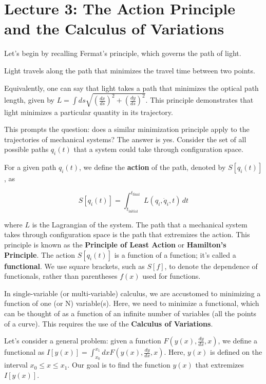 \section{Lecture 3: The Action Principle and the Calculus of Variations}

Let's begin by recalling Fermat's principle, which governs the path of light.

\begin{definition}
    Light travels along the path that minimizes the travel time between two points.
\end{definition}

Equivalently, one can say that light takes a path that minimizes the optical path length, 
given by $L = \int ds \sqrt{\left(\frac{dx}{ds}\right)^2 + \left(\frac{dy}{ds}\right)^2}$. This principle demonstrates that light minimizes a particular quantity in its trajectory.

This prompts the question: does a similar minimization principle apply to the 
trajectories of mechanical systems? The answer is yes. Consider the set of all possible 
paths $q_i(t)$ that a system could take through configuration space.

For a given path $q_i(t)$, we define the \textbf{action} of the path, denoted by 
$S[q_i(t)]$, as

\[
    S[q_i(t)] = \int_{t_{\text{initial}}}^{t_{\text{final}}} L(q_i, \dot{q}_i, t) \, dt
\]

where $L$ is the Lagrangian of the system. The path that a mechanical system takes 
through configuration space is the path that extremizes the action. This principle is 
known as the \textbf{Principle of Least Action} or \textbf{Hamilton's Principle}. The 
action $S[q_i(t)]$ is a function of a function; it's called a \textbf{functional}. We use 
square brackets, such as $S[f]$, to denote the dependence of functionals, rather than 
parentheses $f(x)$ used for functions.

In single-variable (or multi-variable) calculus, we are accustomed to minimizing a 
function of one (or N) variable(s). Here, we need to minimize a functional, which can be 
thought of as a function of an infinite number of variables (all the points of a curve). 
This requires the use of the \textbf{Calculus of Variations}.

Let's consider a general problem: given a function $F(y(x), \frac{dy}{dx}, x)$, we define 
a functional as $I[y(x)]=\int_{x_{0}}^{x_{1}} dx F(y(x), \frac{dy}{dx}, x)$. Here, $y(x)$ 
is defined on the interval $x_0 \leq x \leq x_1$. Our goal is to find the function $y(x)$ 
that extremizes $I[y(x)]$.

